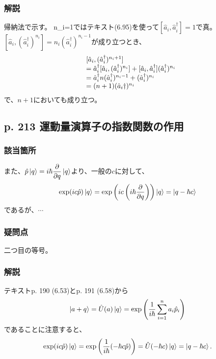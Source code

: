 \documentclass{jsarticle}
\begin{document}
\subsubsection*{解説}
帰納法で示す。
n_i=1ではテキスト(6.95)を使って$[\hat{a}_i,\hat{a}_i^\dagger]=1$で真。
$[\hat{a}_i,(\hat{a}_i^\dagger)^{n_i}]=n_i(\hat{a}_i^\dagger)^{n_i-1}$が成り立つとき、
\begin{equation*}
    \begin{array}[]{cl}
        &
        [\hat{a}_i,(\hat{a}_i^\dagger)^{n_i+1}]
        \\
        &=
        \hat{a}_i^\dagger[\hat{a}_i,(\hat{a}_i^\dagger)^{n_i}]
        +
        [\hat{a}_i,\hat{a}_i^\dagger](\hat{a}_i^\dagger)^{n_i}
        \\
        &=
        \hat{a}_i^\dagger n(\hat{a}_i^\dagger)^{n_i-1}
        +
        (\hat{a}_i^\dagger)^{n_i}
        \\
        &=
        (n+1)(\hat{a}_i\dagger)^{n_i}
    \end{array}
\end{equation*}
で、$n+1$においても成り立つ。


\subsection*{p. 213 運動量演算子の指数関数の作用}

\subsubsection*{該当箇所}

また、$\hat{p}\ket{q}=i\hbar\dfrac{\partial}{\partial q}\ket{q}$より、一般の$c$に対して、
\begin{equation*}
    \exp(ic\hat{p})\ket{q}
    =
    \exp\left(
        ic\left(
            i\hbar\dfrac{\partial}{\partial q}
        \right)
    \right)
    \ket{q}
    =
    \ket{q-\hbar c}
\end{equation*}
であるが、$\cdots$

\subsubsection*{疑問点}
二つ目の等号。

\subsubsection*{解説}
テキストp. 190 (6.53)とp. 191 (6.58)から
\begin{equation*}
    \ket{a+q}
    =
    \hat{U}(a)\ket{q}
    =
    \exp\left(
        \dfrac{1}{i\hbar}\sum_{i=1}^na_i\hat{p}_i
    \right)
\end{equation*}
であることに注意すると、
\begin{equation*}
    \exp(ic\hat{p})\ket{q}
    =
    \exp\left(
        \dfrac{1}{i\hbar}(-\hbar c\hat{p})
    \right)
    =
    \hat{U}(-\hbar c)\ket{q}
    =
    \ket{q-\hbar c}.
\end{equation*}
\end{document}
